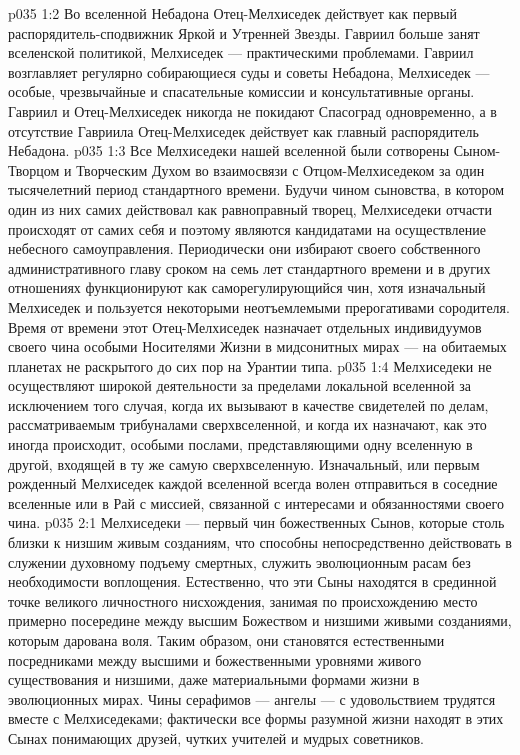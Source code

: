 \vs p035 1:2 Во вселенной Небадона Отец\hyp{}Мелхиседек действует как первый распорядитель\hyp{}сподвижник Яркой и Утренней Звезды. Гавриил больше занят вселенской политикой, Мелхиседек --- практическими проблемами. Гавриил возглавляет регулярно собирающиеся суды и советы Небадона, Мелхиседек --- особые, чрезвычайные и спасательные комиссии и консультативные органы. Гавриил и Отец\hyp{}Мелхиседек никогда не покидают Спасоград одновременно, а в отсутствие Гавриила Отец\hyp{}Мелхиседек действует как главный распорядитель Небадона.
\vs p035 1:3 Все Мелхиседеки нашей вселенной были сотворены Сыном\hyp{}Творцом и Творческим Духом во взаимосвязи с Отцом\hyp{}Мелхиседеком за один тысячелетний период стандартного времени. Будучи чином сыновства, в котором один из них самих действовал как равноправный творец, Мелхиседеки отчасти происходят от самих себя и поэтому являются кандидатами на осуществление небесного самоуправления. Периодически они избирают своего собственного административного главу сроком на семь лет стандартного времени и в других отношениях функционируют как саморегулирующийся чин, хотя изначальный Мелхиседек и пользуется некоторыми неотъемлемыми прерогативами сородителя. Время от времени этот Отец\hyp{}Мелхиседек назначает отдельных индивидуумов своего чина особыми Носителями Жизни в мидсонитных мирах --- на обитаемых планетах не раскрытого до сих пор на Урантии типа.
\vs p035 1:4 Мелхиседеки не осуществляют широкой деятельности за пределами локальной вселенной за исключением того случая, когда их вызывают в качестве свидетелей по делам, рассматриваемым трибуналами сверхвселенной, и когда их назначают, как это иногда происходит, особыми послами, представляющими одну вселенную в другой, входящей в ту же самую сверхвселенную. Изначальный, или первым рожденный Мелхиседек каждой вселенной всегда волен отправиться в соседние вселенные или в Рай с миссией, связанной с интересами и обязанностями своего чина.
\vs p035 2:1 Мелхиседеки --- первый чин божественных Сынов, которые столь близки к низшим живым созданиям, что способны непосредственно действовать в служении духовному подъему смертных, служить эволюционным расам без необходимости воплощения. Естественно, что эти Сыны находятся в срединной точке великого личностного нисхождения, занимая по происхождению место примерно посередине между высшим Божеством и низшими живыми созданиями, которым дарована воля. Таким образом, они становятся естественными посредниками между высшими и божественными уровнями живого существования и низшими, даже материальными формами жизни в эволюционных мирах. Чины серафимов --- ангелы --- с удовольствием трудятся вместе с Мелхиседеками; фактически все формы разумной жизни находят в этих Сынах понимающих друзей, чутких учителей и мудрых советников.
